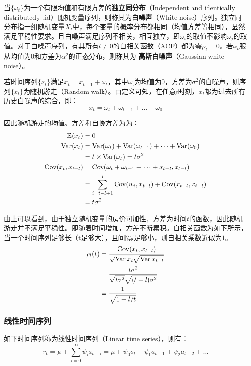 \documentclass[11pt]{article}
\begin{document}
当$\{\omega_t\}$为一个有限均值和有限方差的\textbf{独立同分布}（Independent and identically distributed，iid）随机变量序列，则称其为\textbf{白噪声}（White noise）序列。独立同分布指一组随机变量$X_t$中，每个变量的概率分布都相同（均值方差等相同），显然满足平稳性要求。且白噪声满足序列不相关，相互独立，即$\omega_i$的取值不影响$\omega_j$的取值。对于白噪声序列，有其所有$l \neq 0 $的自相关函数（ACF）都为零$\rho_l = 0$。若$\omega_t$服从均值为$0$和方差为$\alpha^{2}$的正态分布，则称其为\textbf{
高斯白噪声}（Gaussian white noise）。

若时间序列$\{x_t\}$满足$x_t = x_{t-1} + \omega_t$，其中$\omega_t$为均值为$0$，方差为$\sigma^2$的白噪声，则序列$\{x_t\}$为随机游走（Random walk）。由定义可知，在任意$t$时刻，$x_t$都为过去所有历史白噪声的综合，即：
\begin{equation*}
    x_t = \omega_{t} + \omega_{t-1} + \dots + \omega_0
\end{equation*}

因此随机游走的均值、方差和自协方差为为：
\begin{align*}
    \mathbb{E}(x_t) &= 0 \\
    \operatorname{Var}(x_t) &= \operatorname{Var}(\omega_{t}) + \operatorname{Var}(\omega_{t-1}) + \dots + \operatorname{Var}(\omega_{0}) \\
    &= t \times \operatorname{Var}(\omega_t) = t \sigma^2 \\
    \operatorname{Cov}(x_t,x_{t-l}) &= \operatorname{Cov}(\omega_{t}+ \omega_{t-1} + \dots + x_{t-l},x_{t-l}) \\
    &= \sum_{i=t-l+1}^{t} \operatorname{Cov}(w_i,x_{t-l}) + \operatorname{Cov}(x_{t-l},x_{t-l}) \\
    &= t\sigma^2
\end{align*}

由上可以看到，由于独立随机变量的房价可加性，方差为时间$t$的函数，因此随机游走并不满足平稳性。即随着时间增加，方差不断累积。自相关函数为如下所示，当一个时间序列足够长（t足够大），且间隔$l$足够小，则自相关系数近似为$1$。
\begin{align*}
    \rho_l(t) &= \frac{\operatorname{Cov}(x_{t},x_{t-l})}{\sqrt{\operatorname{Var}{x_{t}}}\sqrt{\operatorname{Var}{x_{t-l}}}} \\
    &= \frac{t\sigma^2}{\sqrt{t\sigma^2}\sqrt{(t-l)\sigma^2}} \\
    &= \frac{1}{\sqrt{1-l/t}}
\end{align*}

\subsubsection{线性时间序列}

如下时间序列称为线性时间序列（Linear time series），则有：
\begin{equation*}
    r_t = \mu + \sum_{i=0}^{\infty} \psi_i a_{t-i} = \mu + \psi_0 a_{t} + \psi_1 a_{t-1} + \psi_2 a_{t-2} + \dots
\end{equation*}
\end{document}

